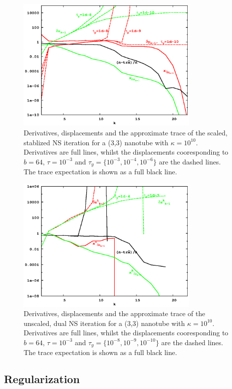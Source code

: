 \documentclass[letterpaper,twocolumn,amsmath,amsfont,amssymb,english,aps,jcp,preprintnumbers,groupaddress,nofootinbib,tightenlines]{revtex4}
\begin{document}
\begin{figure}[h]
\includegraphics[width=3.5in]{fig_33_tube_cond_10_scaled/33_tube_k10_scale_dual.eps}
\caption{Derivatives, displacements and the approximate trace of the scaled, stablized NS iteration for a
(3,3) nanotube with $\kappa =10^{10}$.
Derivatives are full lines, whilst the displacements cooresponding to $b=64$,
$\tau=10^{-3}$ and $\tau_y=\{10^{-3},10^{-4},10^{-6}\}$
are the dashed lines.  The trace expectation is shown as a full black line. }
\end{figure}

\begin{figure}[h]
\includegraphics[width=3.5in]{fig_33_tube_cond_10_scaled/33_tube_k10_scale_stab.eps}
\caption{Derivatives, displacements and the approximate trace of the unscaled, dual NS iteration for a (3,3) nanotube with $\kappa =10^{10}$.
Derivatives are full lines, whilst the displacements cooresponding to $b=64$, $\tau=10^{-3}$ and $\tau_y=\{10^{-8}, 10^{-9}, 10^{-10}\}$
are the dashed lines.  The trace expectation is shown as a full black line. }
\end{figure}

\subsection{Regularization}
\end{document}
